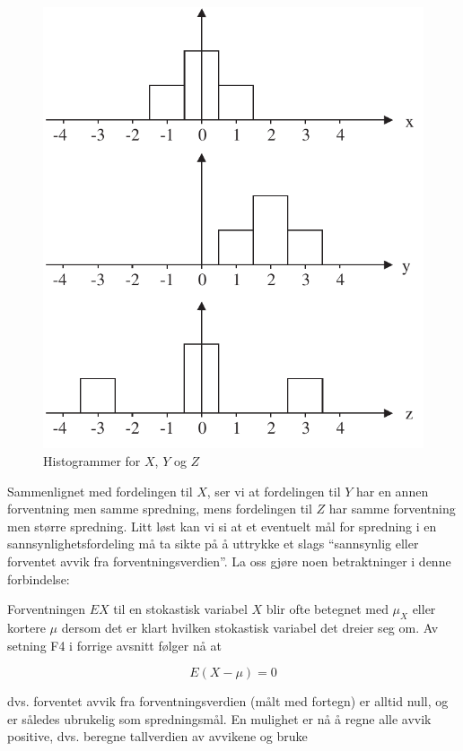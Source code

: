 \begin{figure}[H]
\centering
\includegraphics[scale=0.9]{figurer/fig5_3.pdf}
\caption{Histogrammer for $X$, $Y$ og $Z$}
	\label{fig:histXYZ}
\end{figure}

\noindent Sammenlignet med fordelingen til $X$, ser vi at fordelingen til
$Y$ har en annen forventning men samme spredning, mens
fordelingen til $Z$ har samme forventning men større spredning.
Litt løst kan vi si at et eventuelt mål for spredning i en
sannsynlighetsfordeling må ta sikte på å uttrykke et slags
``sannsynlig eller forventet avvik fra forventningsverdien''. La
oss gjøre noen betraktninger i denne forbindelse:

Forventningen $EX$ til en stokastisk variabel $X$ blir ofte
betegnet med $\mu_X$ eller kortere $\mu$ dersom det er klart
hvilken stokastisk variabel det dreier seg om. Av setning F4 i
forrige avsnitt følger nå at

\[        E (X - \mu ) = 0 \]

\noindent dvs. forventet avvik fra forventningsverdien (målt med fortegn)
er alltid null, og er således ubrukelig som spredningsmål. En
mulighet er nå å regne alle avvik positive, dvs. beregne tallverdien 
av avvikene og bruke

